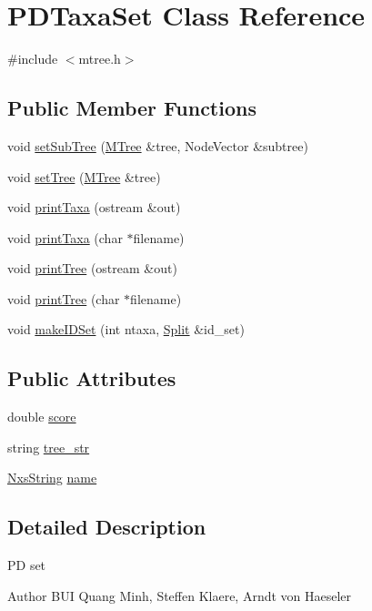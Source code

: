 \hypertarget{classPDTaxaSet}{
\section{PDTaxaSet Class Reference}
\label{classPDTaxaSet}
}


{\ttfamily \#include $<$mtree.h$>$}\subsection*{Public Member Functions}
\begin{DoxyCompactItemize}
\item 
void \hyperlink{classPDTaxaSet_aaec7e5e2824f3b853cfc95c9b66658d3}{setSubTree} (\hyperlink{classMTree}{MTree} \&tree, NodeVector \&subtree)
\item 
void \hyperlink{classPDTaxaSet_aa025792b1112c59c6335da02133cd1d5}{setTree} (\hyperlink{classMTree}{MTree} \&tree)
\item 
void \hyperlink{classPDTaxaSet_a077e50e0d00317fd16f49b1e6ec61833}{printTaxa} (ostream \&out)
\item 
void \hyperlink{classPDTaxaSet_ac9d03151ac179718da133ff5032cfcf1}{printTaxa} (char $\ast$filename)
\item 
void \hyperlink{classPDTaxaSet_a0984e1dde694d35ebbbeef292d29a182}{printTree} (ostream \&out)
\item 
void \hyperlink{classPDTaxaSet_a602f719dcbdaccbe9e39c7c984419262}{printTree} (char $\ast$filename)
\item 
void \hyperlink{classPDTaxaSet_a1d0a17a1df458f812f50def71d399d0b}{makeIDSet} (int ntaxa, \hyperlink{classSplit}{Split} \&id\_\-set)
\end{DoxyCompactItemize}
\subsection*{Public Attributes}
\begin{DoxyCompactItemize}
\item 
double \hyperlink{classPDTaxaSet_aa281eabc1b4daf3d617933ad5be08356}{score}
\item 
string \hyperlink{classPDTaxaSet_a70b88295e19674b5cee453c411114dc1}{tree\_\-str}
\item 
\hyperlink{classNxsString}{NxsString} \hyperlink{classPDTaxaSet_a25fe9fd5ea2bf9ecd576353cba7f84cc}{name}
\end{DoxyCompactItemize}


\subsection{Detailed Description}
PD set \begin{DoxyAuthor}{Author}
BUI Quang Minh, Steffen Klaere, Arndt von Haeseler 
\end{DoxyAuthor}



